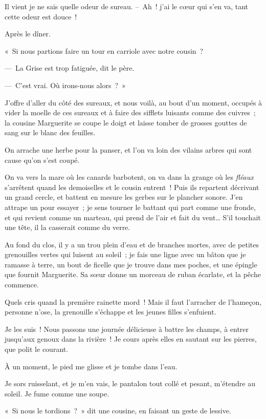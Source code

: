 \documentclass[french,twoside]{book} %
\begin{document}
Il vient je ne sais quelle odeur de sureau. – Ah ! j’ai le cœur qui s’en va, tant cette odeur est douce !\par
\bigbreak
\noindent Après le dîner.\par
« Si nous partions faire un tour en carriole avec notre cousin ?\par
— La Grise est trop fatiguée, dit le père.\par
— C’est vrai. Où irons-nous alors ? »\par
J’offre d’aller du côté des sureaux, et nous voilà, au bout d’un moment, occupés à vider la moelle de ces sureaux et à faire des sifflets luisants comme des cuivres ; la cousine Marguerite se coupe le doigt et laisse tomber de grosses gouttes de sang sur le blanc des feuilles.\par
On arrache une herbe pour la panser, et l’on va loin des vilains arbres qui sont cause qu’on s’est coupé.\par
On va vers la mare où les canards barbotent, on va dans la grange où les \emph{fléaux} s’arrêtent quand les demoiselles et le cousin entrent ! Puis ils repartent décrivant un grand cercle, et battent en mesure les gerbes sur le plancher sonore. J’en attrape un pour essayer ; je sens tourner le battant qui part comme une fronde, et qui revient comme un marteau, qui prend de l’air et fait du vent… S’il touchait une tête, il la casserait comme du verre.\par
Au fond du clos, il y a un trou plein d’eau et de branches mortes, avec de petites grenouilles vertes qui luisent au soleil ; je fais une ligne avec un bâton que je ramasse à terre, un bout de ficelle que je trouve dans mes poches, et une épingle que fournit Marguerite. Sa sœur donne un morceau de ruban écarlate, et la pêche commence.\par
Quels cris quand la première rainette mord ! Mais il faut l’arracher de l’hameçon, personne n’ose, la grenouille s’échappe et les jeunes filles s’enfuient.\par
\bigbreak
\noindent Je les suis ! Nous passons une journée délicieuse à battre les champs, à entrer jusqu’aux genoux dans la rivière ! Je cours après elles en sautant sur les pierres, que polit le courant.\par
À un moment, le pied me glisse et je tombe dans l’eau.\par
Je sors ruisselant, et je m’en vais, le pantalon tout collé et pesant, m’étendre au soleil. Je fume comme une soupe.\par
« Si nous le tordions ? » dit une cousine, en faisant un geste de lessive.\par
\end{document}
